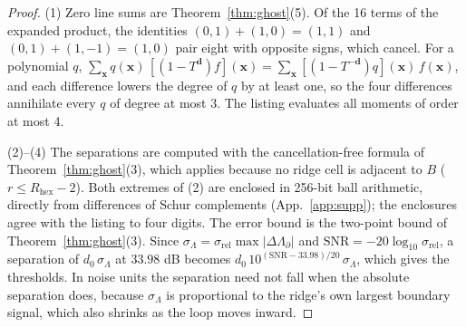 \documentclass[11pt,a4paper]{article}
\theoremstyle{definition}
\theoremstyle{remark}
\begin{document}
\begin{proof}
(1) Zero line sums are Theorem~\ref{thm:ghost}(5). Of the 16 terms of the expanded product, the identities $(0,1)+(1,0) = (1,1)$ and $(0,1)+(1,-1) = (1,0)$ pair eight with opposite signs, which cancel. For a polynomial $q$, $\sum_{\mathbf{x}} q(\mathbf{x})\,[(1-T^{\mathbf{d}})f](\mathbf{x}) = \sum_{\mathbf{x}}[(1-T^{-\mathbf{d}})q](\mathbf{x})\,f(\mathbf{x})$, and each difference lowers the degree of $q$ by at least one, so the four differences annihilate every $q$ of degree at most 3. The listing evaluates all moments of order at most 4.

(2)--(4) The separations are computed with the cancellation-free formula of Theorem~\ref{thm:ghost}(3), which applies because no ridge cell is adjacent to $B$ ($r\le R_{\text{hex}}-2$). Both extremes of (2) are enclosed in 256-bit ball arithmetic, directly from differences of Schur complements (App.~\ref{app:supp}); the enclosures agree with the listing to four digits. The error bound is the two-point bound of Theorem~\ref{thm:ghost}(3). Since $\sigma_\Lambda = \sigma_{\text{rel}}\max|\Delta\Lambda_\partial|$ and $\text{SNR} = -20\log_{10}\sigma_{\text{rel}}$, a separation of $d_0\,\sigma_\Lambda$ at $33.98$ dB becomes $d_0\,10^{(\text{SNR}-33.98)/20}\,\sigma_\Lambda$, which gives the thresholds. In noise units the separation need not fall when the absolute separation does, because $\sigma_\Lambda$ is proportional to the ridge's own largest boundary signal, which also shrinks as the loop moves inward.
\end{proof}
\end{document}
